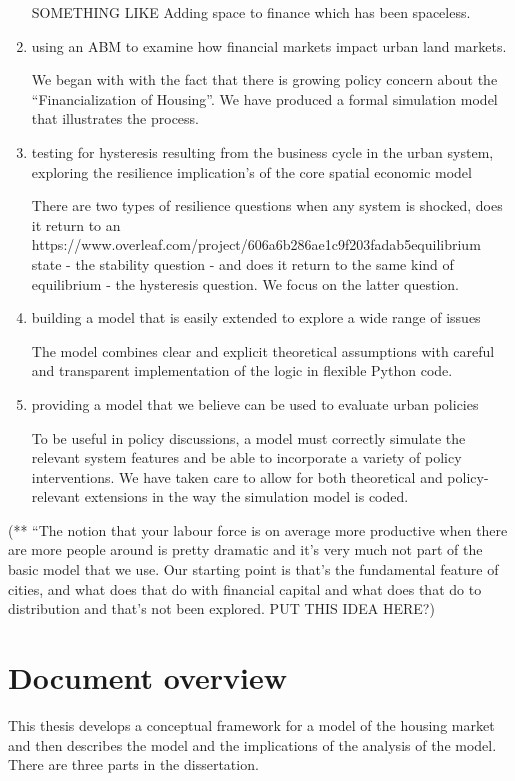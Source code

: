 \begin{enumerate}
SOMETHING LIKE Adding space to finance which has been spaceless.
    
    \item using an ABM to examine how financial markets impact  urban \glspl{land market}.

We began with with the fact that there is growing policy concern about the ``Financialization of  Housing''. We have produced a formal simulation model that illustrates the process. 

    \item testing for \gls{hysteresis} resulting from the business cycle   in the urban system, exploring the \gls{resilience} implication's of the core spatial economic model

There are two types of resilience questions when any system is shocked, does it return to an https://www.overleaf.com/project/606a6b286ae1c9f203fadab5equilibrium state - the stability question - and does it return to the same kind of equilibrium - the hysteresis question. We focus on the latter question.  

    \item building a model that is easily extended to explore a wide range of issues

The model combines clear and explicit theoretical assumptions with careful and transparent implementation of the logic in flexible Python code.

    \item providing a model that we believe can be used  to evaluate urban policies

To be useful in policy discussions, a model must correctly simulate the relevant system features and be able to incorporate a variety of policy interventions. We have taken care to allow for  both theoretical and policy- relevant extensions in the way the simulation model is coded. 
\end{enumerate}

(** ``The notion that your labour force is on average more productive when there are more people around is pretty dramatic and it's very much not part of the basic model that we use. Our starting point is that's the fundamental feature of cities, and what does that do with financial capital and what does that do to distribution and that's not been explored. PUT THIS IDEA HERE?)

\section{Document overview}
This thesis develops a conceptual framework for a model of the housing market and then describes the model and the implications of the analysis of the model. %
There are three parts in the dissertation. 

